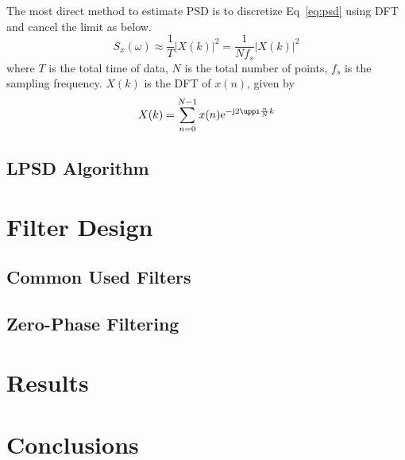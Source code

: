 The most direct method to estimate PSD is to discretize Eq~\eqref{eq:psd} using DFT and cancel the limit as below.
\begin{equation}
    S_x(\omega) \approx \frac{1}{T} \left| X(k) \right|^2 = \frac{1}{Nf_s} \left| X(k) \right|^2
\end{equation}
where $T$ is the total time of data, $N$ is the total number of points, $f_s$ is the sampling frequency. $X(k)$ is the DFT of $x(n)$, given by
\begin{equation}
    X(k) = \sum_{n=0}^{N-1} x(n) \iexp{-\mathrm{j} 2 \uppi \frac{n}{N}k}
\end{equation}


\subsection{LPSD Algorithm}





\section{Filter Design}





\subsection{Common Used Filters}




\subsection{Zero-Phase Filtering}




\section{Results}




\section{Conclusions}





